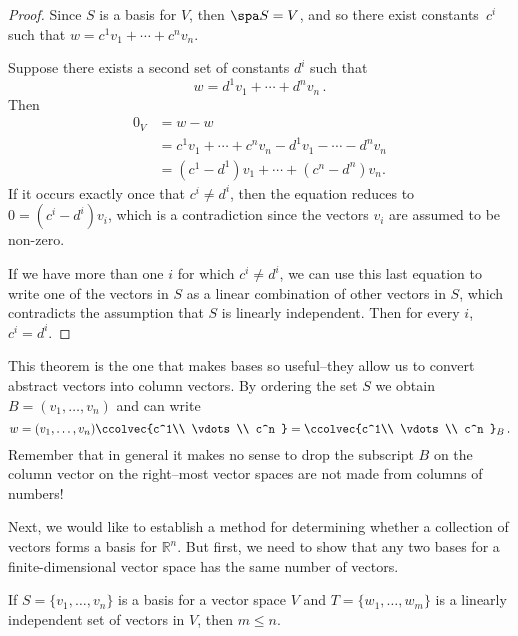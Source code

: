 \begin{proof}
Since $S$ is a basis for $V$, then $\spa S=V$, and so there exist constants~$c^i$ such that $w=c^1v_1+\cdots + c^nv_n$.

Suppose there exists a second set of constants $d^i$ such that 
\[w=d^1v_1+\cdots + d^nv_n\, .\]  Then
\begin{align*}
0_V&=w-w\\
&=c^1v_1+\cdots + c^nv_n-d^1v_1-\cdots - d^nv_n \\[1mm]
&=(c^1-d^1)v_1+\cdots + (c^n-d^n)v_n.
\end{align*}
If it occurs exactly once that $c^i\neq d^i$, then the equation reduces to $0=(c^i-d^i)v_i$, which is a contradiction since the vectors $v_i$ are assumed to be non-zero.

If we have more than one $i$ for which $c^i\neq d^i$, we can use this last equation to write one of the vectors in $S$ as a linear combination of other vectors in $S$, which contradicts the assumption that $S$ is linearly independent.  Then for every $i$, $c^i=d^i$.
\end{proof}


\begin{remark}
This theorem is the one that makes bases so useful--they allow us to convert abstract vectors into column vectors.
By ordering the set $S$ we obtain $B=(v_1,\ldots,v_n)$ and can write
\[
w=(v_1,\ldots,v_n) \ccolvec{c^1\\ \vdots\\ c^n }=\ccolvec{c^1\\ \vdots\\ c^n }_B\, .
\]
Remember that in general it makes no sense to drop the subscript $B$ on the column vector on the right--most vector spaces  are not made from  columns of numbers!
\end{remark}


Next, we would like to establish a method for determining whether a collection of vectors forms a basis for $\mathbb{R}^n$.  But first, we need to show that any two bases for a finite-dimensional vector space has the same number of vectors.

\begin{lemma}\label{mlessn}
If $S=\{v_1, \ldots, v_n \}$ is a basis for a vector space $V$ and $T=\{w_1, \ldots, w_m \}$ is a linearly independent set of vectors in $V$, then $m\leq n$.
\end{lemma}

